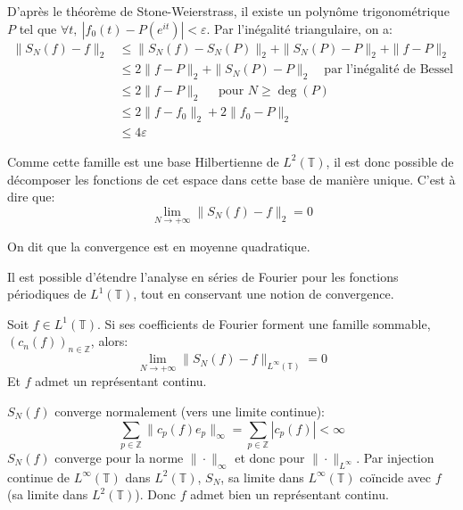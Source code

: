 \begin{myproof}
				D'après le théorème de Stone-Weierstrass, il existe un polynôme trigonométrique $P$ tel que $\forall t,  ~ |f_0(t) - P(e^{it})| < \varepsilon $.
				Par l'inégalité triangulaire, on a:
				\begin{align*}
					\| S_N(f) -f \|_2 &\leqslant \|S_N(f) - S_N(P)\|_2 + \| S_N(P) - P \|_2 + \| f- P \|_2 \\
				&	\leqslant 2 \| f - P\|_2 + \| S_N(P) - P\|_2 \quad \text{par l'inégalité de Bessel} \\
				& \leqslant 2 \| f - P\|_2 \quad \text{ pour } N\geqslant \deg(P) \\
				& \leqslant 2 \| f - f_0\|_2 + 2 \| f_0- P\|_2 \\
				& \leqslant 4 \varepsilon
				\end{align*}
				\cqfd
				
			\end{myproof}
			
		Comme cette famille est une base Hilbertienne de $L^2(\mathbb{T})$, il est donc possible de décomposer les fonctions de cet espace dans cette base de manière unique. C'est à dire que:
				$$ \lim_{N\to +\infty} \|S_N(f) -f \|_2 = 0 $$
				
		On dit que la convergence est en moyenne quadratique. 

	Il est possible d'étendre l'analyse en séries de Fourier pour les fonctions périodiques de $L^1(\mathbb{T})$, tout en conservant une notion de convergence. 
	
	\begin{mythm}
		Soit $f \in L^1(\mathbb{T})$. Si ses coefficients de Fourier forment une famille sommable, $(c_n(f))_{n\in\mathbb{Z}} $, alors: 
		$$ \lim_{N\to +\infty} \|S_N(f) -f \|_{L^\infty(\mathbb{T})} = 0 $$ 
		Et $f$ admet un représentant continu. 

	\end{mythm}
			
	\begin{myproof}

		$S_N(f)$ converge normalement (vers une limite continue): 
		$$ \sum_{p \in \mathbb{Z}} \|c_p(f)e_p\|_\infty = \sum_{p \in \mathbb{Z}} |c_p(f)| < \infty $$
		$S_N(f)$ converge pour la norme $\| \cdot \|_\infty $ et donc pour $\| \cdot \|_{L^{\infty}} $.
		Par injection continue de $L^\infty(\mathbb{T})$ dans $L^2(\mathbb{T})$, $S_N$, sa limite dans $L^\infty(\mathbb{T})$ coïncide avec $f$ (sa limite dans $L^2(\mathbb{T})$). Donc $f$ admet bien un représentant continu. 
		
		\cqfd
	\end{myproof}
	
